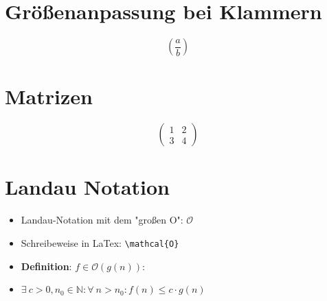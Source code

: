 \documentclass{scrartcl}
\begin{document}
\section{Größenanpassung bei Klammern}

\[
\left( \frac{a}{b} \right) 
\]

\section{Matrizen}

\begin{equation*}	
\begin{pmatrix}
1 & 2 \\
3 & 4
\end{pmatrix}
\end{equation*}

\section{Landau Notation}

\begin{itemize}
\item Landau-Notation mit dem "großen O": $\mathcal{O}$
\item Schreibeweise in LaTex: \texttt{\textbackslash mathcal\{O\}}
\vspace{5mm}
\item \textbf{Definition}: $f \in \mathcal{O}(g(n)):$
\item  $\exists\  c > 0, n_0 \in \mathbb{N}: \forall\ n > n_0: f(n) \leq c \cdot g(n)$
\vspace{5mm}
\end{itemize}
	
\end{document}
